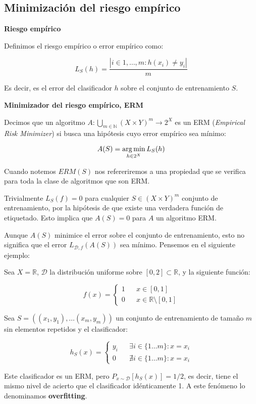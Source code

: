 \subsection{Minimización del riesgo empírico}

\begin{definition*} \textbf{Riesgo empírico}

Definimos el riesgo empírico o error empírico como:

\[L_S(h) = \frac{|i\in {1,\ldots, m}: h(x_i) \neq y_i|}{m}\]

\end{definition*}

Es decir, es el error del clasificador $h$ sobre el conjunto de entrenamiento $S$. 

\begin{definition*} \textbf{Minimizador del riesgo empírico, ERM}

Decimos que un algoritmo $A: \underset{m\in \mathbb{N}}{\bigcup} (X\times Y)^m \rightarrow 2^{X}$ es un ERM 
(\emph{Empirical Risk Minimizer}) si busca una hipótesis cuyo error empírico sea mínimo:

\[A(S) = \operatorname*{arg\,min}_{h\in 2^X} L_S(h)\]
\end{definition*}

Cuando notemos $ERM(S)$ nos refereriremos a una propiedad que se verifica para toda la clase de algoritmos que son ERM.

Trivialmente $L_S(f) = 0$ para cualquier $S \in (X \times Y)^m$ conjunto de entrenamiento, por la hipótesis de que existe una
verdadera función de etiquetado. Esto implica que $A(S) = 0$ para $A$ un algoritmo ERM.

Aunque $A(S)$ minimice el error sobre el conjunto de entrenamiento, esto no significa que el error $L_{\mathcal{D},f} (A(S))$ 
sea mínimo. Pensemos en el siguiente ejemplo:

\begin{example}
Sea $X = \mathbb{R}$, $\mathcal{D}$ la distribución uniforme sobre $[0,2]\subset \mathbb{R}$, y la siguiente función:

\[f(x) = \left\{\begin{array}{lcl}
1 && x\in [0,1]\\
0 && x\in \mathbb{R}\setminus [0,1]
\end{array}\right.\]


Sea $S = ((x_1,y_1), \ldots (x_m, y_m))$ un conjunto de entrenamiento de tamaño $m$ sin elementos repetidos y el clasificador:

\[h_S(x) = \left\{\begin{array}{lcl}
y_i && \exists i\in \{1\ldots m\} : x=x_i\\
0 && \nexists i\in \{1\ldots m\} : x=x_i
\end{array}\right.\]

Este clasificador es un ERM, pero $P_{x\sim \mathcal{D}}[h_S(x)] = 1/2$, es decir, tiene el mismo nivel de acierto que el 
clasificador idénticamente 1. A este fenómeno lo denominamos \textbf{overfitting}.
\end{example}

